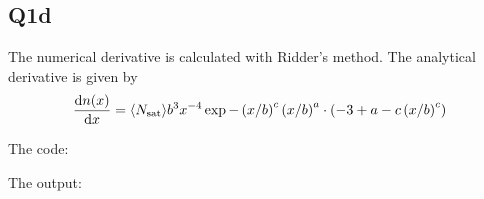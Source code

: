 \subsection{Q1d}

The numerical derivative is calculated with Ridder's method. The analytical derivative is given by
\begin{equation}
    \frac{\mathrm{d} n(x)}{\mathrm{d} x} 
    = \langle N_{\rm sat} \rangle b^{3} x^{-4} \exp{-\left( x/b \right)^{c}} \left( x/b \right)^{a} \cdot (-3 + a - c \left( x/b \right)^{c})
\end{equation}

\noindent The code:



\noindent The output:


